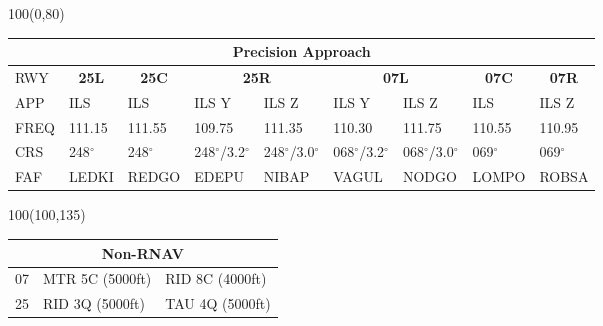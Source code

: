 \documentclass[10pt,landscape,a4paper]{article}
\begin{document}
\begin{textblock}{100}(0,80)
\begin{table}[]
\begin{tabular}{|l|l|l|l|l|l|l|l|l|}
\multicolumn{9}{c}{\textbf{Precision Approach}}                                                                                                                                                                            \\ \hline
RWY  & \multicolumn{1}{c|}{\textbf{25L}} & \multicolumn{1}{c|}{\textbf{25C}} & \multicolumn{2}{c|}{\textbf{25R}} & \multicolumn{2}{c|}{\textbf{07L}} & \multicolumn{1}{c|}{\textbf{07C}} & \multicolumn{1}{c|}{\textbf{07R}} \\ \hline
APP  & ILS                               & ILS                               & ILS Y           & ILS Z           & ILS Y           & ILS Z           & ILS                               & ILS Z                             \\
FREQ & 111.15                            & 111.55                            & 109.75          & 111.35          & 110.30          & 111.75          & 110.55                            & 110.95                            \\
CRS  & 248$^\circ$                              & 248$^\circ$                              & 248$^\circ$/3.2$^\circ$       & 248$^\circ$/3.0$^\circ$       & 068$^\circ$/3.2$^\circ$       & 068$^\circ$/3.0$^\circ$       & 069$^\circ$                              & 069$^\circ$                              \\
FAF  & LEDKI                             & REDGO                             & EDEPU           & NIBAP           & VAGUL           & NODGO           & LOMPO                             & ROBSA                             \\ \hline
\end{tabular}
\end{table}
\end{textblock}



\begin{textblock}{100}(100,135)
\begin{table}[]
\begin{tabular}{|l|l|l|}
\multicolumn{3}{c}{\textbf{Non-RNAV}} \\ \hline
07  & MTR 5C (5000ft)    & RID 8C (4000ft)   \\ \hline
25  & RID 3Q (5000ft)    & TAU 4Q (5000ft)   \\ \hline
\end{tabular}
\end{table}
\end{textblock}
\end{document}
